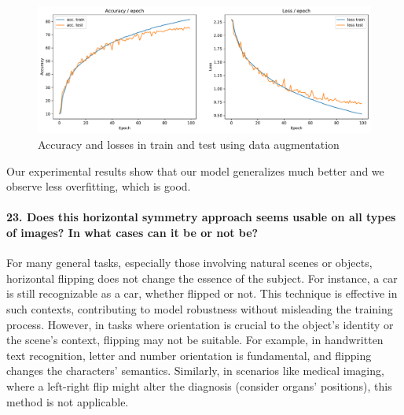\documentclass{article}
\theoremstyle{plain}%
\theoremstyle{definition}
\theoremstyle{remark}
\begin{document}
\begin{figure}[H]
    \centering
    \includegraphics*[width=\textwidth]{figs/CNN/dataincrease.pdf}
    \caption{Accuracy and losses in train and test using data augmentation}
    \label{fig:dataincrease}
\end{figure}

Our experimental results show that our model generalizes much better and we observe less overfitting, which is good.

\paragraph{23. Does this horizontal symmetry approach seems usable on all types of images? In what cases can it be or not be?}
For many general tasks, especially those involving natural scenes or objects, horizontal flipping does not change the essence of the subject. For instance, a car is still recognizable as a car, whether flipped or not. This technique is effective in such contexts, contributing to model robustness without misleading the training process. However, in tasks where orientation is crucial to the object's identity or the scene's context, flipping may not be suitable. For example, in handwritten text recognition, letter and number orientation is fundamental, and flipping changes the characters' semantics. Similarly, in scenarios like medical imaging, where a left-right flip might alter the diagnosis (consider organs' positions), this method is not applicable.
\end{document}
